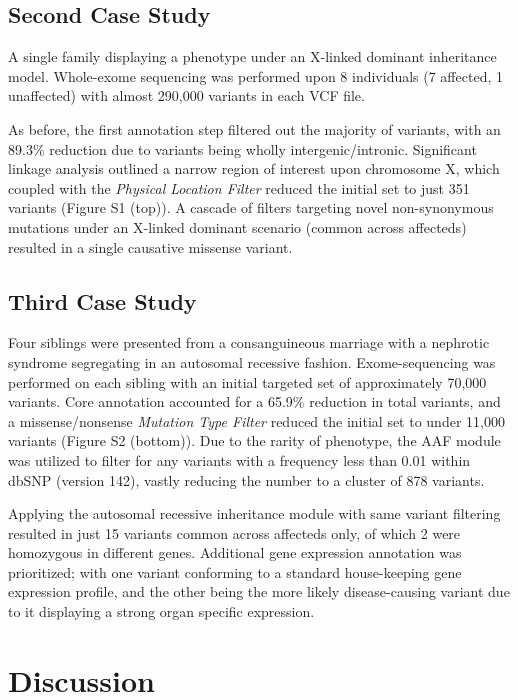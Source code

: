 \documentclass[twocolumn]{bmcart}%
\newcounter{changeCount}
\newcommand{\changes}[1]{
		\stepcounter{changeCount}
		{\tiny\bf\color{violet}\arabic{changeCount}}
		{\color{red} #1}
	}
\newcommand{\changes}[1]{#1}
\begin{document}
\changes{
\subsection*{Second Case Study}
A  single  family  displaying  a  phenotype  under  an  X-linked dominant inheritance model. Whole-exome sequencing was performed upon 8 individuals (7 affected, 1 unaffected) with almost 290,000  variants in each VCF file. 

As before, the first annotation step filtered out the majority of variants, with an 89.3\% reduction due to variants being wholly intergenic/intronic. Significant linkage  analysis  outlined  a  narrow  region  of  interest upon chromosome X, which coupled with the \textit{Physical Location Filter} reduced the initial set to just 351 variants (Figure S1 (top)). A cascade of filters targeting novel  non-synonymous  mutations  under  an  X-linked dominant scenario (common across affecteds) resulted in a single causative missense variant.


\subsection*{Third Case Study}

Four siblings were presented from a consanguineous marriage with a nephrotic syndrome segregating in an autosomal recessive fashion. Exome-sequencing was
performed on each sibling with an initial targeted set of approximately 70,000 variants. Core annotation accounted for a 65.9\% reduction in total variants, and a missense/nonsense \textit{Mutation Type Filter} reduced the initial set to under 11,000 variants (Figure S2 (bottom)). Due to the rarity of phenotype, the AAF module was utilized to filter for any variants with a frequency less than 0.01 within dbSNP (version 142), vastly reducing the number to a cluster of 878 variants.

Applying the autosomal recessive inheritance module with same variant filtering resulted in just 15 variants common across affecteds only, of which 2 were
homozygous in different genes. Additional gene expression annotation was prioritized; with one variant conforming to a standard house-keeping gene expression
profile, and the other being the more likely disease-causing variant due to it displaying a strong organ specific expression.
}



\section*{Discussion}
\end{document}
